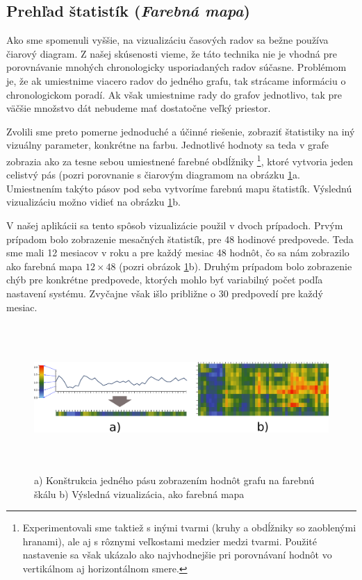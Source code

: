 \subsection{Prehľad štatistík {\small(\textit{Farebná mapa})}}
\label{sec:colormap}
Ako sme spomenuli vyššie, na vizualizáciu časových radov sa bežne používa čiarový diagram. Z našej skúsenosti vieme, že táto technika nie je vhodná pre porovnávanie mnohých chronologicky usporiadaných radov súčasne. Problémom je, že ak umiestnime viacero radov do jedného grafu, tak strácame informáciu o chronologickom poradí. Ak však umiestnime rady do grafov jednotlivo, tak pre väčšie množstvo dát nebudeme mať dostatočne veľký priestor.

Zvolili sme preto pomerne jednoduché a účinné riešenie, zobraziť štatistiky na iný vizuálny parameter, konkrétne na farbu. Jednotlivé hodnoty sa teda v grafe zobrazia ako za tesne sebou umiestnené farebné obdĺžniky \footnote{Experimentovali sme taktiež s inými tvarmi (kruhy a obdĺžniky so zaoblenými hranami), ale aj s rôznymi veľkostami medzier medzi tvarmi. Použité nastavenie sa však ukázalo ako najvhodnejšie pri porovnávaní hodnôt vo vertikálnom aj horizontálnom smere.}, ktoré vytvoria jeden celistvý pás (pozri porovnanie s čiarovým diagramom na obrázku \ref{fig:colormap}a. Umiestnením takýto pásov pod seba vytvoríme farebnú mapu štatistík. Výslednú vizualizáciu možno vidieť na obrázku \ref{fig:colormap}b. 

V našej aplikácii sa tento spôsob vizualizácie použil v dvoch prípadoch. Prvým prípadom bolo zobrazenie mesačných štatistík, pre 48 hodinové predpovede. Teda sme mali 12 mesiacov v roku a pre každý mesiac 48 hodnôt, čo sa nám zobrazilo ako farebná mapa $ 12 \times 48 $ (pozri obrázok \ref{fig:colormap}b). Druhým prípadom bolo zobrazenie chýb pre konkrétne predpovede, ktorých mohlo byť variabilný počet podľa nastavení systému. Zvyčajne však išlo približne o 30 predpovedí pre každý mesiac.

\begin{figure}
	\centering
	\hspace*{-0.45in}
	\includegraphics[width = 7.0in, height = 2.2in]{colormap}
	\caption{a) Konštrukcia jedného pásu zobrazením hodnôt grafu na farebnú škálu b) Výsledná vizualizácia, ako farebná mapa }
	\label{fig:colormap}
\end{figure}

